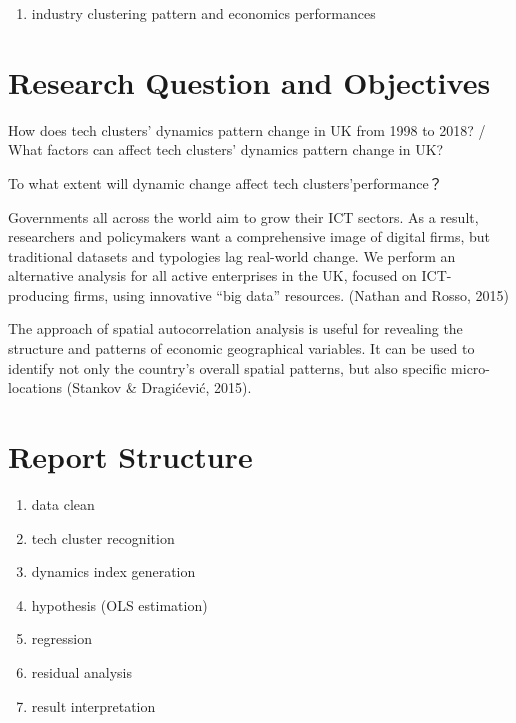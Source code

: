 \documentclass[
  12pt,
  oneside]{book}
\providecommand{\tightlist}{%
  \setlength{\itemsep}{0pt}\setlength{\parskip}{0pt}}
\begin{document}
\begin{enumerate}
\def\labelenumi{\arabic{enumi}.}
\setcounter{enumi}{2}
\tightlist
\item
  industry clustering pattern and economics performances
\end{enumerate}

\hypertarget{research-question-and-objectives}{%
\section{Research Question and Objectives}\label{research-question-and-objectives}}

How does tech clusters' dynamics pattern change in UK from 1998 to 2018? / What factors can affect tech clusters' dynamics pattern change in UK?

To what extent will dynamic change affect tech clusters'performance？

Governments all across the world aim to grow their ICT sectors. As a result, researchers and policymakers want a comprehensive image of digital firms, but traditional datasets and typologies lag real-world change. We perform an alternative analysis for all active enterprises in the UK, focused on ICT-producing firms, using innovative ``big data'' resources.
(Nathan and Rosso, 2015)

The approach of spatial autocorrelation analysis is useful for revealing the structure and patterns of economic geographical variables. It can be used to identify not only the country's overall spatial patterns, but also specific micro-locations (Stankov \& Dragićević, 2015).

\hypertarget{report-structure}{%
\section{Report Structure}\label{report-structure}}

\begin{enumerate}
\def\labelenumi{\arabic{enumi}.}
\tightlist
\item
  data clean
\item
  tech cluster recognition
\item
  dynamics index generation
\item
  hypothesis (OLS estimation)
\item
  regression
\item
  residual analysis
\item
  result interpretation
\end{enumerate}
\end{document}
